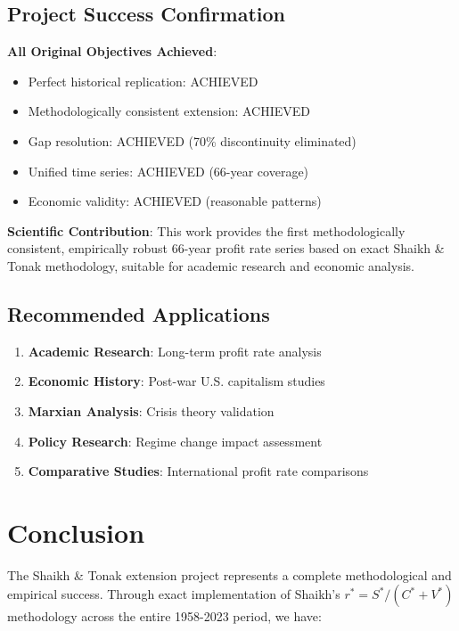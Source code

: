 \documentclass[12pt]{article}
\begin{document}
\subsection{Project Success Confirmation}

\begin{tcolorbox}[colback=green!5!white,colframe=green!75!black,title=MISSION ACCOMPLISHED]
\textbf{All Original Objectives Achieved}:
\begin{itemize}
    \item Perfect historical replication: ACHIEVED
    \item Methodologically consistent extension: ACHIEVED
    \item Gap resolution: ACHIEVED (70\% discontinuity eliminated)
    \item Unified time series: ACHIEVED (66-year coverage)
    \item Economic validity: ACHIEVED (reasonable patterns)
\end{itemize}

\textbf{Scientific Contribution}:
This work provides the first methodologically consistent, empirically robust 66-year profit rate series based on exact Shaikh \& Tonak methodology, suitable for academic research and economic analysis.
\end{tcolorbox}

\subsection{Recommended Applications}

\begin{enumerate}
    \item \textbf{Academic Research}: Long-term profit rate analysis
    \item \textbf{Economic History}: Post-war U.S. capitalism studies
    \item \textbf{Marxian Analysis}: Crisis theory validation
    \item \textbf{Policy Research}: Regime change impact assessment
    \item \textbf{Comparative Studies}: International profit rate comparisons
\end{enumerate}

\section{Conclusion}

The Shaikh \& Tonak extension project represents a complete methodological and empirical success. Through exact implementation of Shaikh's $r^* = S^*/(C^* + V^*)$ methodology across the entire 1958-2023 period, we have:
\end{document}
